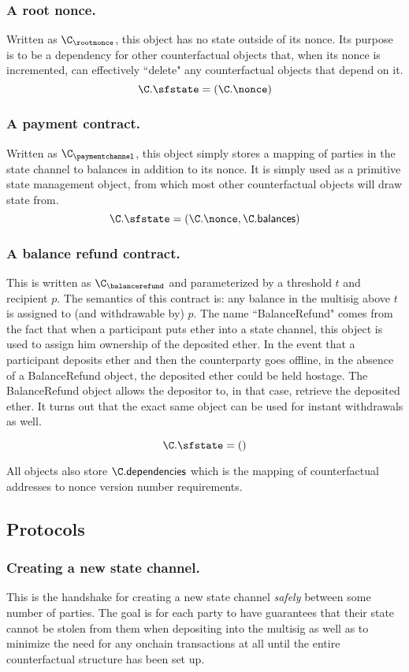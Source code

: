 \documentclass[prb,floatfix,reprint,nofootinbib,amsmath,amssymb,epsfig,pre,floats,letterpaper,groupedaffiliation,tightenlines,allcolors=blue,11pt]{revtex4}
\theoremstyle{definition}
\theoremstyle{definition}
\theoremstyle{definition}
\begin{document}
\subsubsection{A root nonce.} Written as $\C_\rootnonce$, this object has no state outside of its nonce. Its purpose is to be a dependency for other counterfactual objects that, when its nonce is incremented, can effectively ``delete" any counterfactual objects that depend on it.
\[ \C.\sfstate = (\C.\nonce) \]
\subsubsection{A payment contract.} Written as $\C_\paymentchannel$, this object simply stores a mapping of parties in the state channel to balances in addition to its nonce. It is simply used as a primitive state management object, from which most other counterfactual objects will draw state from.
\[ \C.\sfstate = (\C.\nonce, \C.\textsf{balances}) \]
\subsubsection{A balance refund contract.} This is written as $\C_\balancerefund$ and parameterized by a threshold $t$ and recipient $p$. The semantics of this contract is: any balance in the multisig above $t$ is assigned to (and withdrawable by) $p$. The name ``BalanceRefund" comes from the fact that when a participant puts ether into a state channel, this object is used to assign him ownership of the deposited ether. In the event that a participant deposits ether and then the counterparty goes offline, in the absence of a BalanceRefund object, the deposited ether could be held hostage. The BalanceRefund object allows the depositor to, in that case, retrieve the deposited ether. It turns out that the exact same object can be used for instant withdrawals as well.

\[ \C.\sfstate = () \]

All objects also store $\C.\textsf{dependencies}$ which is the mapping of counterfactual addresses to nonce version number requirements.

\subsection{Protocols}


\subsubsection{Creating a new state channel.} This is the handshake for creating a new state channel \textit{safely} between some number of parties. The goal is for each party to have guarantees that their state cannot be stolen from them when depositing into the multisig as well as to minimize the need for any onchain transactions at all until the entire counterfactual structure has been set up.
\end{document}
